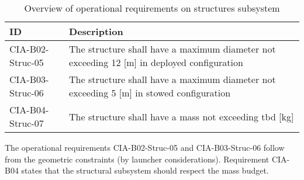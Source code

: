 \begin{table}[H]
	\caption{Overview of operational requirements on structures subsystem}
	\begin{tabular}{|p{}|p{}|}
    \hline
    ID          & Description                                                                                                      \\ \hline \hline
    CIA-B02-Struc-05 & The structure shall have a maximum diameter not exceeding 12 [m] in deployed configuration     \\ \hline
    CIA-B03-Struc-06 &  The structure shall have a maximum diameter not exceeding 5 [m] in stowed configuration                              \\ \hline
    CIA-B04-Struc-07 & The structure shall have a mass not exceeding \gls{tbd} [kg]\\ \hline
    \end{tabular}
    \label{tab:strucoprequirements}
\end{table}
The operational requirements CIA-B02-Struc-05 and CIA-B03-Struc-06 follow from the geometric constraints (by launcher considerations). Requirement CIA-B04 states that the structural subsystem should respect the mass budget.